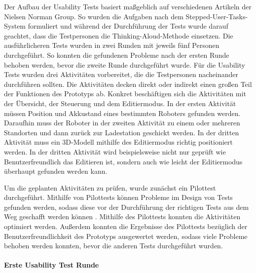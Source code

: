 Der Aufbau der Usability Tests basiert maßgeblich auf verschiedenen Artikeln der Nielsen Norman Group. So wurden die Aufgaben nach dem Stepped-User-Tasks-System \cite{Pernice.2020} formuliert und während der Durchführung der Tests wurde darauf geachtet, dass die Testpersonen die Thinking-Aloud-Methode \cite{Nielsen.2012b} einsetzen. Die ausführlicheren Tests wurden in zwei Runden mit jeweils fünf Personen durchgeführt. So konnten die gefundenen Probleme nach der ersten Runde behoben werden, bevor die zweite Runde durchgeführt wurde. Für die Usability Tests wurden drei Aktivitäten vorbereitet, die die Testpersonen nacheinander durchführen sollten. Die Aktivitäten decken direkt oder indirekt einen großen Teil der Funktionen des Prototyps ab. Konkret beschäftigen sich die Aktivitäten mit der Übersicht, der Steuerung und dem Editiermodus. In der ersten Aktivität müssen Position und Akkustand eines bestimmten Roboters gefunden werden. Daraufhin muss der Roboter in der zweiten Aktivität zu einem oder mehreren Standorten und dann zurück zur Ladestation geschickt werden. In der dritten Aktivität muss ein 3D-Modell mithilfe des Editiermodus richtig positioniert werden. In der dritten Aktivität wird beispielsweise nicht nur geprüft wie Benutzerfreundlich das Editieren ist, sondern auch wie leicht der Editiermodus überhaupt gefunden werden kann.

Um die geplanten Aktivitäten zu prüfen, wurde zunächst ein Pilottest durchgeführt. Mithilfe von Pilottests können Probleme im Design von Tests gefunden werden, sodass diese vor der Durchführung der richtigen Tests aus dem Weg geschafft werden können \cite{Schade.2015}. Mithilfe des Pilottests konnten die Aktivitäten optimiert werden. Außerdem konnten die Ergebnisse des Pilottests bezüglich der Benutzerfreundlichkeit des Prototyps ausgewertet werden, sodass viele Probleme behoben werden konnten, bevor die anderen Tests durchgeführt wurden.

\paragraph{Erste Usability Test Runde}


